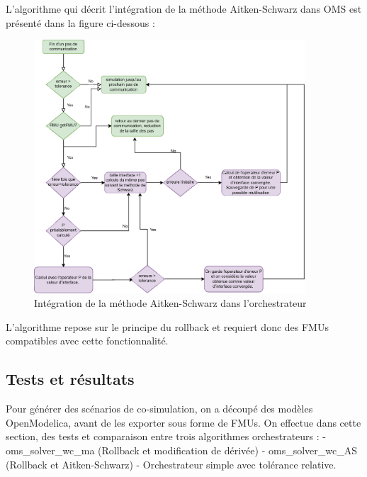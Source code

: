 L'algorithme qui décrit l'intégration de la méthode Aitken-Schwarz dans OMS est présenté dans la figure ci-dessous :
\begin{figure}[hbt!]
    \label{fig:AS} 
    \centering
    \includegraphics[width = 0.9\textwidth]{ajoutAitkenOPS.drawio.eps}
    \caption{Intégration de la méthode Aitken-Schwarz dans l'orchestrateur}
\end{figure}

L'algorithme repose sur le principe du rollback et requiert donc des FMUs compatibles avec cette fonctionnalité.
\subsection{Tests et résultats}

Pour générer des scénarios de co-simulation, on a découpé des modèles OpenModelica, avant de les exporter sous forme de FMUs. On effectue dans cette section, des tests et comparaison entre trois algorithmes orchestrateurs : 
-  oms\_solver\_wc\_ma (Rollback et modification de dérivée) - oms\_solver\_wc\_AS (Rollback et Aitken-Schwarz) - Orchestrateur simple avec tolérance relative.
 
